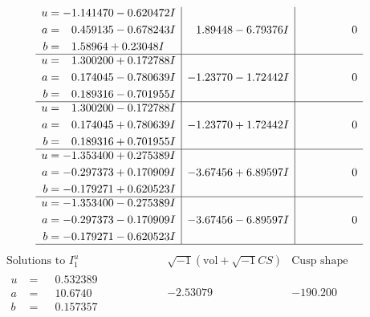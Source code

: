 \documentclass[1p]{elsarticle_modified}
\theoremstyle{definition}
\newcommand{\I}{\sqrt{-1}}
\begin{document}
$$\begin{array}{c|c|c}
\begin{aligned}
u &= -1.141470 - 0.620472 I \\
a &= \phantom{-}0.459135 - 0.678243 I \\
b &= \phantom{-}1.58964 + 0.23048 I\end{aligned}
 & \phantom{-}1.89448 - 6.79376 I & \phantom{-0.000000 } 0 \\ \hline\begin{aligned}
u &= \phantom{-}1.300200 + 0.172788 I \\
a &= \phantom{-}0.174045 - 0.780639 I \\
b &= \phantom{-}0.189316 - 0.701955 I\end{aligned}
 & -1.23770 - 1.72442 I & \phantom{-0.000000 } 0 \\ \hline\begin{aligned}
u &= \phantom{-}1.300200 - 0.172788 I \\
a &= \phantom{-}0.174045 + 0.780639 I \\
b &= \phantom{-}0.189316 + 0.701955 I\end{aligned}
 & -1.23770 + 1.72442 I & \phantom{-0.000000 } 0 \\ \hline\begin{aligned}
u &= -1.353400 + 0.275389 I \\
a &= -0.297373 + 0.170909 I \\
b &= -0.179271 + 0.620523 I\end{aligned}
 & -3.67456 + 6.89597 I & \phantom{-0.000000 } 0 \\ \hline\begin{aligned}
u &= -1.353400 - 0.275389 I \\
a &= -0.297373 - 0.170909 I \\
b &= -0.179271 - 0.620523 I\end{aligned}
 & -3.67456 - 6.89597 I & \phantom{-0.000000 } 0\\
 \hline 
 \end{array}$$\newpage$$\begin{array}{c|c|c}  
\text{Solutions to }I^u_{1}& \I (\text{vol} + \sqrt{-1}CS) & \text{Cusp shape}\\
 \hline 
\begin{aligned}
u &= \phantom{-}0.532389\phantom{ +0.000000I} \\
a &= \phantom{-}10.6740\phantom{ +0.000000I} \\
b &= \phantom{-}0.157357\phantom{ +0.000000I}\end{aligned}
 & -2.53079\phantom{ +0.000000I} & -190.200\phantom{ +0.000000I} \\ \hline\begin{aligned}

\end{aligned}
\end{array}$$
\end{document}
